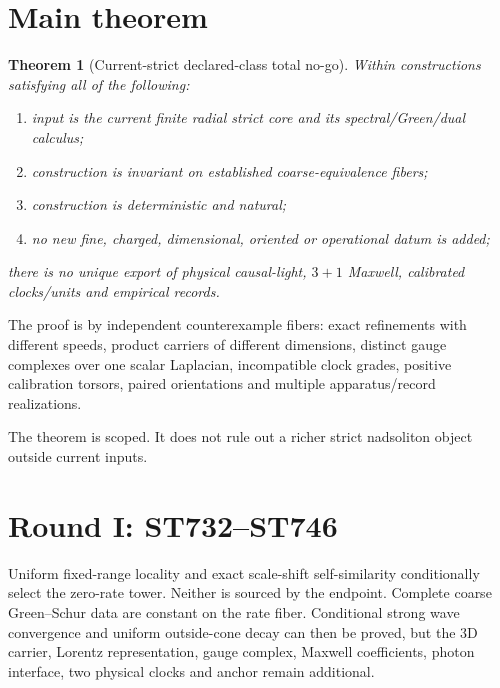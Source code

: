 \documentclass[11pt,a4paper]{article}
\newtheorem{theorem}{Theorem}[section]\newcommand{\prv}{\textcolor{g}{\textbf{[PROVEN]}}}\newcommand{\cnd}{\textcolor{b}{\textbf{[CONDITIONAL]}}}\newcommand{\blk}{\textcolor{r}{\textbf{[BLOCKED]}}}
\begin{document}
\section{Main theorem}
\begin{theorem}[Current-strict declared-class total no-go]
Within constructions satisfying all of the following:
\begin{enumerate}
\item input is the current finite radial strict core and its spectral/Green/dual calculus;
\item construction is invariant on established coarse-equivalence fibers;
\item construction is deterministic and natural;
\item no new fine, charged, dimensional, oriented or operational datum is added;
\end{enumerate}
there is no unique export of physical causal-light, $3+1$ Maxwell, calibrated clocks/units and empirical records.
\end{theorem}
\noindent The proof is by independent counterexample fibers: exact refinements with different speeds, product carriers of different dimensions, distinct gauge complexes over one scalar Laplacian, incompatible clock grades, positive calibration torsors, paired orientations and multiple apparatus/record realizations.

The theorem is scoped. It does not rule out a richer strict nadsoliton object outside current inputs.

\section{Round I: ST732--ST746}
Uniform fixed-range locality and exact scale-shift self-similarity conditionally select the zero-rate tower. Neither is sourced by the endpoint. Complete coarse Green--Schur data are constant on the rate fiber. Conditional strong wave convergence and uniform outside-cone decay can then be proved, but the $3$D carrier, Lorentz representation, gauge complex, Maxwell coefficients, photon interface, two physical clocks and anchor remain additional.
\end{document}
